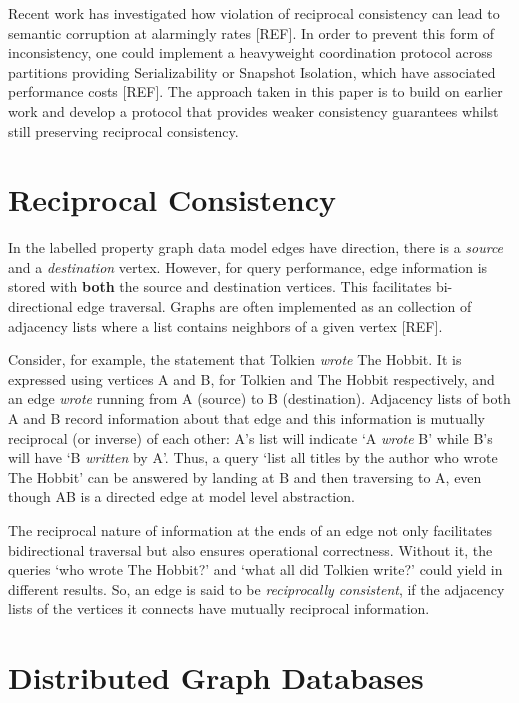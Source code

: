 \documentclass[sigplan,screen]{acmart}
\begin{document}
Recent work has investigated how violation of reciprocal consistency can lead to semantic corruption at alarmingly rates [REF]. In order to prevent this form of inconsistency, one could implement a heavyweight coordination protocol across partitions providing Serializability or Snapshot Isolation, which have associated performance costs [REF]. The approach taken in this paper is to build on earlier work and develop a protocol that provides weaker consistency guarantees whilst still preserving reciprocal consistency.

\section{Reciprocal Consistency}
\label{sec:recipr-cons}

In the labelled property graph data model edges have direction, there is a \textit{source} and a \textit{destination} vertex. However, for query performance, edge information is stored with \textbf{both} the source and destination vertices. This facilitates bi-directional edge traversal. Graphs are often implemented as an collection of adjacency lists where a list contains neighbors of a given vertex [REF].

Consider, for example, the statement that Tolkien \textit{wrote} The Hobbit. It is expressed using vertices A and B, for Tolkien and The Hobbit respectively, and an edge \textit{wrote} running from A (source) to B (destination). Adjacency lists of both A and B record information about that edge and this information is mutually reciprocal (or inverse) of each other: A's list will indicate `A \textit{wrote} B' while B's will have `B \textit{written} by A'. Thus, a query `list all titles by the author who wrote The Hobbit' can be answered by landing at B and then traversing to A, even though AB is a directed edge at model level abstraction.

The reciprocal nature of information at the ends of an edge not only facilitates bidirectional traversal but also ensures operational correctness. Without it, the queries `who wrote The Hobbit?' and `what all did Tolkien write?' could yield in different results. So, an edge is said to be \textit{reciprocally consistent}, if the adjacency lists of the vertices it connects have mutually reciprocal information.


\section{Distributed Graph Databases}
\end{document}
